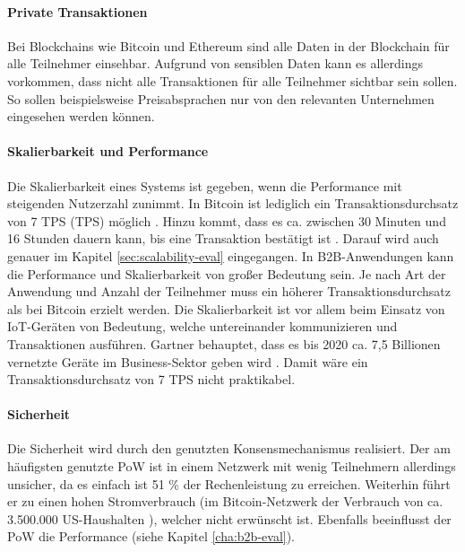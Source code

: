 \paragraph{Private Transaktionen}
Bei Blockchains wie Bitcoin und Ethereum sind alle Daten in der Blockchain für alle Teilnehmer einsehbar. Aufgrund von sensiblen Daten kann es allerdings vorkommen, dass nicht alle Transaktionen für alle Teilnehmer sichtbar sein sollen. So sollen beispielsweise Preisabsprachen nur von den relevanten Unternehmen eingesehen werden können.

\paragraph{Skalierbarkeit und Performance}
Die Skalierbarkeit eines Systems ist gegeben, wenn die Performance mit steigenden Nutzerzahl zunimmt. In Bitcoin ist lediglich ein Transaktionsdurchsatz von 7 \acl{TPS} (\acs{TPS}) möglich \cite{ZhengBlockchainChallengesOpportunities2017}. Hinzu kommt, dass es ca. zwischen 30 Minuten und 16 Stunden dauern kann, bis eine Transaktion bestätigt ist \cite{BuchkoHowLongBitcoin2017}. Darauf wird auch genauer im Kapitel \ref{sec:scalability-eval} eingegangen. In B2B-Anwendungen kann die Performance und Skalierbarkeit von großer Bedeutung sein. Je nach Art der Anwendung und Anzahl der Teilnehmer muss ein höherer Transaktionsdurchsatz als bei Bitcoin erzielt werden. Die Skalierbarkeit ist vor allem beim Einsatz von IoT-Geräten von Bedeutung, welche untereinander kommunizieren und Transaktionen ausführen. Gartner behauptet, dass es bis 2020 ca. 7,5 Billionen vernetzte Geräte im Business-Sektor geben wird \cite{RobGartnerSaysBillion2017}. Damit wäre ein Transaktionsdurchsatz von 7 TPS nicht praktikabel.

\paragraph{Sicherheit}
Die Sicherheit wird durch den genutzten Konsensmechanismus realisiert. Der am häufigsten genutzte \acs{PoW} ist in einem Netzwerk mit wenig Teilnehmern allerdings unsicher, da es einfach ist 51 \% der Rechenleistung zu erreichen. Weiterhin führt er zu einen hohen Stromverbrauch (im Bitcoin-Netzwerk der Verbrauch von ca. 3.500.000 US-Haushalten \cite{DigiconomistBitcoinEnergyConsumption}), welcher nicht erwünscht ist. Ebenfalls beeinflusst der \acs{PoW} die Performance (siehe Kapitel \ref{cha:b2b-eval}).



